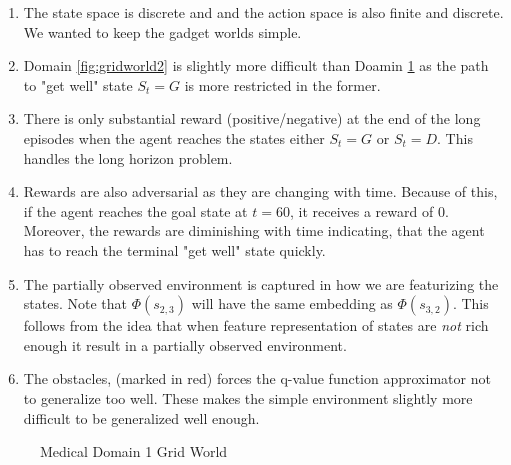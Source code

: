 \begin{enumerate}
\item The state space is discrete and and the action space is also finite and  discrete. We wanted to keep the gadget worlds simple.
\item  Domain \ref{fig:gridworld2} is slightly more difficult than Doamin \ref{fig:gridworld1} as the path to "get well" state $S_t = G$ is more restricted in the former.
\item There is only substantial reward (positive/negative) at the end of the long episodes when the agent reaches the states either $S_t = G$ or $S_t = D$. This handles the long horizon problem.
\item Rewards are also adversarial as they are changing with time. Because of this, if the agent reaches the goal state at $t = 60$, it receives a reward of $0$. Moreover, the rewards are diminishing with time indicating, that the agent has to reach the terminal "get well" state quickly.
\item The partially observed environment is captured in how we are featurizing the states. Note that $\Phi(s_{2,3})$ will have the same embedding as $\Phi(s_{3,2})$. This follows from the idea that when feature representation of states are \textit{not} rich enough it result in a partially observed environment. 
\item The obstacles, (marked in red) forces the q-value function approximator not to generalize too well. These makes the simple environment slightly more difficult to be generalized well enough.
\end{enumerate}


\begin{figure}[!th]
\begin{center}
\end{center}
\caption{Medical Domain 1 Grid World}
\label{fig:gridworld1}
\end{figure}


